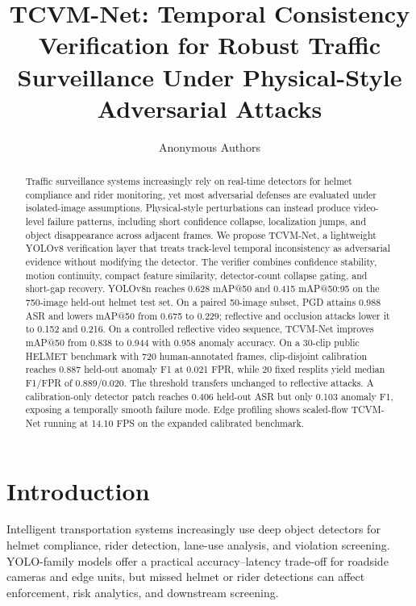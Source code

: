 \documentclass[runningheads,a4paper]{llncs}
\newcommand{\method}{TCVM-Net}
\begin{document}
\title{TCVM-Net: Temporal Consistency Verification for Robust Traffic Surveillance Under Physical-Style Adversarial Attacks}

\author{Anonymous Authors}

\maketitle
\begin{abstract}
Traffic surveillance systems increasingly rely on real-time detectors for helmet compliance and rider monitoring, yet most adversarial defenses are evaluated under isolated-image assumptions. Physical-style perturbations can instead produce video-level failure patterns, including short confidence collapse, localization jumps, and object disappearance across adjacent frames. We propose \method, a lightweight YOLOv8 verification layer that treats track-level temporal inconsistency as adversarial evidence without modifying the detector. The verifier combines confidence stability, motion continuity, compact feature similarity, detector-count collapse gating, and short-gap recovery. YOLOv8n reaches 0.628 mAP@50 and 0.415 mAP@50:95 on the 750-image held-out helmet test set. On a paired 50-image subset, PGD attains 0.988 ASR and lowers mAP@50 from 0.675 to 0.229; reflective and occlusion attacks lower it to 0.152 and 0.216. On a controlled reflective video sequence, \method{} improves mAP@50 from 0.838 to 0.944 with 0.958 anomaly accuracy. On a 30-clip public HELMET benchmark with 720 human-annotated frames, clip-disjoint calibration reaches 0.887 held-out anomaly F1 at 0.021 FPR, while 20 fixed resplits yield median F1/FPR of 0.889/0.020. The threshold transfers unchanged to reflective attacks. A calibration-only detector patch reaches 0.406 held-out ASR but only 0.103 anomaly F1, exposing a temporally smooth failure mode. Edge profiling shows scaled-flow \method{} running at 14.10 FPS on the expanded calibrated benchmark.
\end{abstract}

\section{Introduction}

Intelligent transportation systems increasingly use deep object detectors for helmet compliance, rider detection, lane-use analysis, and violation screening. YOLO-family models offer a practical accuracy--latency trade-off for roadside cameras and edge units, but missed helmet or rider detections can affect enforcement, risk analytics, and downstream screening.
\end{document}
